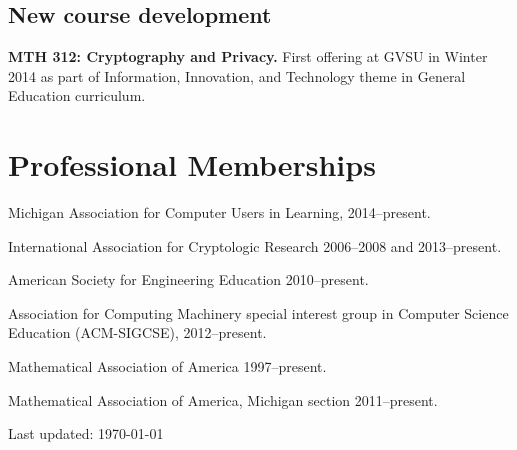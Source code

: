 \documentclass[letterpaper]{article}
\def\footerlink{}
\renewenvironment{itemize}{
  \begin{list}{}{
    \setlength{\leftmargin}{1.5em}
	\setlength{\itemsep}{0in}
  }
}{
  \end{list}
}
\begin{document}
\subsection*{New course development}
\begin{itemize}
	\item \textbf{MTH 312: Cryptography and Privacy. }First offering at GVSU in Winter 2014 as part of Information, Innovation, and Technology theme in General Education curriculum. 
\end{itemize}


\section*{Professional Memberships}
\begin{itemize}
	\item Michigan Association for Computer Users in Learning, 2014--present. 
	\item International Association for Cryptologic Research 2006--2008 and 2013--present. 
	\item American Society for Engineering Education 2010--present.
	\item Association for Computing Machinery special interest group in Computer Science Education (ACM-SIGCSE), 2012--present.
	\item Mathematical Association of America 1997--present. 
	\item Mathematical Association of America, Michigan section 2011--present. 
\end{itemize}




\bigskip

\begin{center}
  \begin{footnotesize}
    Last updated: \today \\
  \end{footnotesize}
\end{center}
\end{document}
